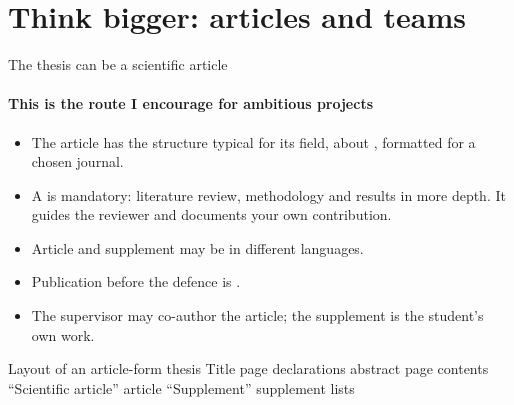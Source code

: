 \documentclass[aspectratio=169,11pt,t]{beamer}
\begin{document}
\section{Think bigger: articles and teams}

\begin{frame}{The thesis can be a scientific article}
  \framesubtitle{This is the route I encourage for ambitious projects}
  \begin{itemize}
    \item The article has the structure typical for its field, about ,
          formatted for a chosen journal.
    \item A  is mandatory: literature review, methodology and results in more depth.
          It guides the reviewer and documents your own contribution.
    \item Article and supplement may be in different languages.
    \item Publication before the defence is .
    \item The supervisor may co-author the article; the supplement is the student's own work.
  \end{itemize}

  \smallskip
  \begin{block}{Layout of an article-form thesis}
    \small Title page \textrightarrow{} declarations \textrightarrow{} abstract page \textrightarrow{} contents
    \textrightarrow{} ``Scientific article'' \textrightarrow{} article \textrightarrow{} ``Supplement''
    \textrightarrow{} supplement \textrightarrow{} lists
  \end{block}
\end{frame}
\end{document}
